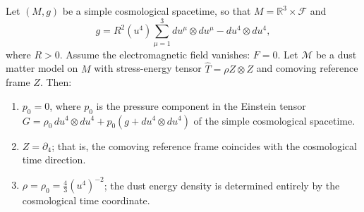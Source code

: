 Let $(M, g)$ be a simple cosmological spacetime, so that $M = \mathbb{R}^3 \times \mathcal{F}$ and
$$g = R^2(u^4) \sum_{\mu=1}^3 du^\mu \otimes du^\mu - du^4 \otimes du^4,$$
where $R > 0$. Assume the electromagnetic field vanishes: $F = 0$.
Let $\mathcal{M}$ be a dust matter model on $M$ with stress-energy tensor $\hat{T} = \rho Z \otimes Z$ and comoving reference frame $Z$.
Then:

\begin{enumerate}
\item[(a)] $p_0 = 0$, where $p_0$ is the pressure component in the Einstein tensor $G = \rho_0 \, du^4 \otimes du^4 + p_0 (g + du^4 \otimes du^4)$ of the simple cosmological spacetime.
\item[(b)] $Z = \partial_4$; that is, the comoving reference frame coincides with the cosmological time direction.
\item[(c)] $\rho = \rho_0 = \frac{4}{3} (u^4)^{-2}$; the dust energy density is determined entirely by the cosmological time coordinate.
\end{enumerate}
